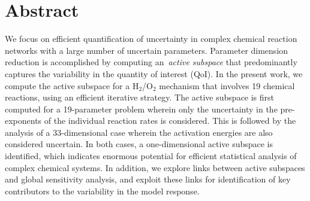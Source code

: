\section*{Abstract}
We focus on efficient quantification of uncertainty in complex chemical
reaction networks with a large number of uncertain parameters.  Parameter
dimension reduction is accomplished by computing an~\emph{active subspace} that
predominantly captures the variability in the quantity of interest (QoI).  In
the present work, we compute the active subspace for a H$_2$/O$_2$ mechanism 
that involves 19 chemical reactions, using an efficient iterative strategy.  The
active subspace is first computed for a 19-parameter problem wherein only the
uncertainty in the pre-exponents of the individual reaction rates is
considered. This is followed by the analysis of a 33-dimensional case wherein
the activation energies are also considered uncertain.  In both cases, a
one-dimensional active subspace is identified, which indicates enormous
potential for efficient statistical analysis of complex chemical systems. In
addition, we explore links between active subspaces and global sensitivity
analysis, and exploit these links for identification of key
contributors to the variability in the model response.
